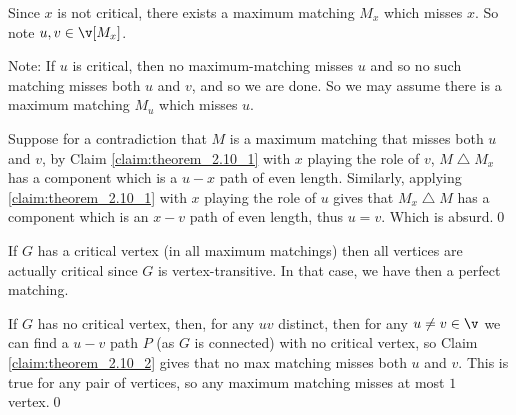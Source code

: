 \begin{prf}
\begin{prf}
\begin{itemize}
            Since $x$ is not critical, there exists a maximum matching $M_x$ which misses $x$. So note $u, v \in \v[M_x]$.

            Note: If $u$ is critical, then no maximum-matching misses $u$ and so no such matching misses both $u$ and $v$, and so we are done. So we may assume there is a maximum matching $M_u$ which misses $u$.

            Suppose for a contradiction that $M$ is a maximum matching that misses both $u$ and $v$, by Claim \ref{claim:theorem_2.10_1} with $x$ playing the role of $v$, $M \bigtriangleup M_x$ has a component which is a $u - x$ path of even length. Similarly, applying \ref{claim:theorem_2.10_1} with $x$ playing the role of $u$ gives that $M_x \bigtriangleup M$ has a component which is an $x - v$ path of even length, thus $u = v$. Which is absurd.\qed
        \end{itemize}
    \end{prf}
    If $G$ has a critical vertex (in all maximum matchings) then all vertices are actually critical since $G$ is vertex-transitive. In that case, we have then a perfect matching.

    If $G$ has no critical vertex, then, for any $uv$ distinct, then for any $u \neq v \in \v$ we can find a $u - v$ path $P$ (as $G$ is connected) with no critical vertex, so Claim \ref{claim:theorem_2.10_2} gives that no max matching misses both $u$ and $v$. This is true for any pair of vertices, so any maximum matching misses at most $1$ vertex.\qed
\end{prf}
